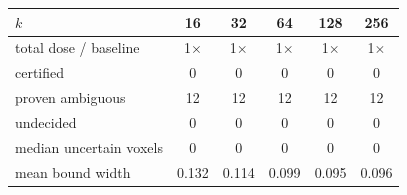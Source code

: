 \begin{tabular}{@{}lccccc@{}}\toprule
$k$ & 16 & 32 & 64 & 128 & 256\\\midrule
total dose / baseline & 1$\times$ & 1$\times$ & 1$\times$ & 1$\times$ & 1$\times$\\
certified & 0 & 0 & 0 & 0 & 0\\
proven ambiguous & 12 & 12 & 12 & 12 & 12\\
undecided & 0 & 0 & 0 & 0 & 0\\
median uncertain voxels & 0 & 0 & 0 & 0 & 0\\
mean bound width & 0.132 & 0.114 & 0.099 & 0.095 & 0.096\\
\bottomrule\end{tabular}
